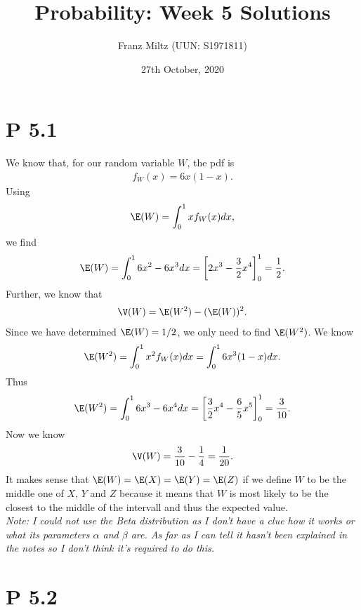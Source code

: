 \documentclass{article}
\begin{document}
\title{Probability: Week 5 Solutions}
\author{Franz Miltz (UUN: S1971811)}
\date{27th October, 2020}
\maketitle


\section*{P 5.1}


We know that, for our random variable $W$, the pdf is
\begin{align*}
  f_W(x) = 6x(1-x).
\end{align*}
Using
\begin{align*}
  \E(W) = \int_0^1 xf_W(x) dx,
\end{align*}
we find
\begin{align*}
  \E(W)=\int_0^1 6x^2-6x^3 dx = \left[2x^3 - \frac{3}{2}x^4\right]^1_0 = \frac{1}{2}.
\end{align*}
Further, we know that
\begin{align*}
  \V(W) = \E(W^2) - (\E(W))^2.
\end{align*}
Since we have determined $\E(W)=1/2$, we only need to find $\E(W^2)$. We know
\begin{align*}
  \E(W^2) = \int_0^1 x^2 f_{W}(x)dx = \int_0^1 6x^3(1-x)dx.
\end{align*}
Thus
\begin{align*}
  \E(W^2) = \int_0^1 6x^3-6x^4 dx = \left[\frac{3}{2} x^4 - \frac{6}{5}x^5\right]_0^1=\frac{3}{10}.
\end{align*}
Now we know
\begin{align*}
  \V(W) = \frac{3}{10}-\frac{1}{4} = \frac{1}{20}.
\end{align*}
It makes sense that $\E(W) = \E(X) = \E(Y) = \E(Z)$ if we define $W$ to be the middle one of $X$, $Y$ and $Z$ because
it means that $W$ is most likely to be the closest to the middle of the intervall and thus the expected value.\\

\emph{Note: I could not use the Beta distribution as I don't have
  a clue how it works or what its parameters $\alpha$ and $\beta$ are.
  As far as I can tell it hasn't been explained in the notes so I don't
  think it's required to do this.}


\section*{P 5.2}
\end{document}
